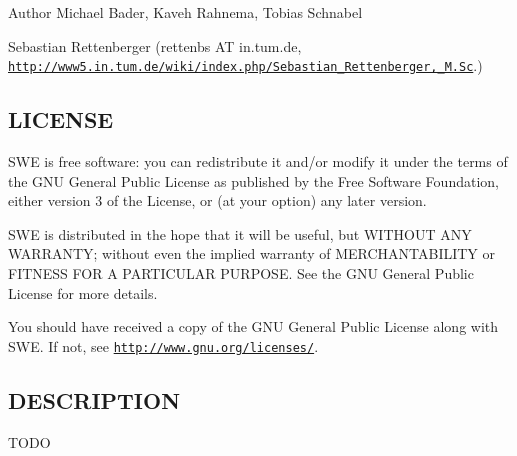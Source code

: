 \begin{DoxyAuthor}{Author}
Michael Bader, Kaveh Rahnema, Tobias Schnabel 

Sebastian Rettenberger (rettenbs A\-T in.\-tum.\-de, \href{http://www5.in.tum.de/wiki/index.php/Sebastian_Rettenberger,_M.Sc}{\tt http\-://www5.\-in.\-tum.\-de/wiki/index.\-php/\-Sebastian\-\_\-\-Rettenberger,\-\_\-\-M.\-Sc}.)
\end{DoxyAuthor}
\hypertarget{Writer_8hh_LICENSE}{}\subsection{L\-I\-C\-E\-N\-S\-E}\label{Writer_8hh_LICENSE}
S\-W\-E is free software\-: you can redistribute it and/or modify it under the terms of the G\-N\-U General Public License as published by the Free Software Foundation, either version 3 of the License, or (at your option) any later version.

S\-W\-E is distributed in the hope that it will be useful, but W\-I\-T\-H\-O\-U\-T A\-N\-Y W\-A\-R\-R\-A\-N\-T\-Y; without even the implied warranty of M\-E\-R\-C\-H\-A\-N\-T\-A\-B\-I\-L\-I\-T\-Y or F\-I\-T\-N\-E\-S\-S F\-O\-R A P\-A\-R\-T\-I\-C\-U\-L\-A\-R P\-U\-R\-P\-O\-S\-E. See the G\-N\-U General Public License for more details.

You should have received a copy of the G\-N\-U General Public License along with S\-W\-E. If not, see \href{http://www.gnu.org/licenses/}{\tt http\-://www.\-gnu.\-org/licenses/}.\hypertarget{NetCdfWriter_8hh_DESCRIPTION}{}\subsection{D\-E\-S\-C\-R\-I\-P\-T\-I\-O\-N}\label{NetCdfWriter_8hh_DESCRIPTION}
T\-O\-D\-O 